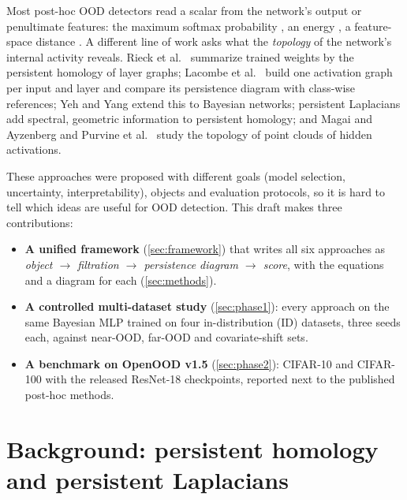 \documentclass[11pt]{article}
\begin{document}
Most post-hoc OOD detectors read a scalar from the network's output or penultimate features:
the maximum softmax probability \citep{hendrycks2017baseline}, an energy \citep{liu2020energy},
a feature-space distance \citep{sun2022knn}. A different line of work asks what the
\emph{topology} of the network's internal activity reveals. Rieck et al.\ \citep{rieck2019neural}
summarize trained weights by the persistent homology of layer graphs; Lacombe et al.\
\citep{lacombe2021topological} build one activation graph per input and layer and compare its
persistence diagram with class-wise references; Yeh and Yang \citep{yeh2025ptu} extend this to
Bayesian networks; persistent Laplacians \citep{wolf2025generalized,jones2025petls,botnan2024nonbranching}
add spectral, geometric information to persistent homology; and Magai and Ayzenberg
\citep{magai2022topology} and Purvine et al.\ \citep{purvine2023cnn} study the topology of point
clouds of hidden activations.

These approaches were proposed with different goals (model selection, uncertainty,
interpretability), objects and evaluation protocols, so it is hard to tell which ideas are useful
for OOD detection. This draft makes three contributions:
\begin{itemize}
  \item \textbf{A unified framework} (\cref{sec:framework}) that writes all six approaches as
  \emph{object $\to$ filtration $\to$ persistence diagram $\to$ score}, with the equations and a
  diagram for each (\cref{sec:methods}).
  \item \textbf{A controlled multi-dataset study} (\cref{sec:phase1}): every approach on the same
  Bayesian MLP trained on four in-distribution (ID) datasets, three seeds each, against near-OOD,
  far-OOD and covariate-shift sets.
  \item \textbf{A benchmark on OpenOOD v1.5} (\cref{sec:phase2}): CIFAR-10 and CIFAR-100 with the
  released ResNet-18 checkpoints, reported next to the published post-hoc methods.
\end{itemize}

\section{Background: persistent homology and persistent Laplacians}
\label{sec:background}
\end{document}
